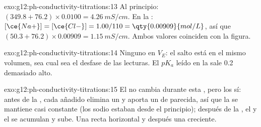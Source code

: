 \begin{solution}{exo:g12:ph-conductivity-titrations:13}
Al principio: $(349.8 + 76.2) \times 0.0100 = \qty{4.26}{mS/cm}$. En la
: $[\ce{Na+}] = [\ce{Cl-}] = 1.00/110 = \qty{0.00909}{mol/L}$,
así que $(50.3 + 76.2) \times 0.00909 = \qty{1.15}{mS/cm}$. Ambos valores
coinciden con la figura.
\end{solution}

\begin{solution}{exo:g12:ph-conductivity-titrations:14}
Ninguno en $V_E$: el salto está en el mismo volumen, sea cual sea el
desfase de las lecturas. El $pK_a$ leído en la  sale 0.2
demasiado alto.
\end{solution}

\begin{solution}{exo:g12:ph-conductivity-titrations:15}
El  no cambia durante esta , pero los  sí: antes de
la , cada  añadido elimina un  y aporta un
 de  parecida, así que la  se mantiene
casi constante (los  sodio estaban desde el principio); después de
la , el  y el  se acumulan y sube. Una recta
horizontal y después una creciente.
\end{solution}

